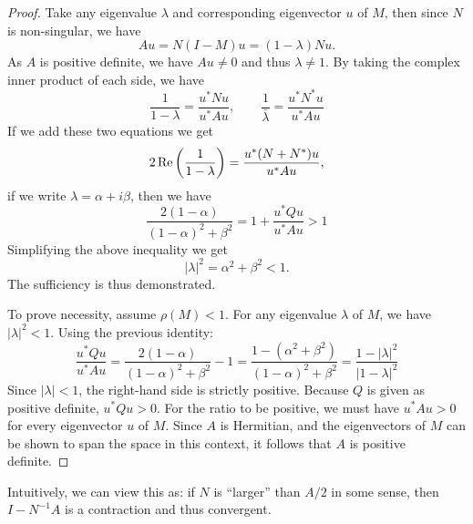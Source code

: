 \documentclass[../main.tex]{subfiles}
\begin{document}
\begin{proof}
	Take any eigenvalue $\lambda$ and corresponding eigenvector $u$ of $M$, then since $N$ is non-singular, we have
	\begin{equation*}
		A u = N(I - M) u = (1 - \lambda) N u.
	\end{equation*}
	As $A$ is positive definite, we have $A u \neq 0$ and thus $\lambda \neq 1$. By taking the complex inner product of each side, we have
	\begin{equation*}
		\frac{1}{1 - \lambda} = \frac{u^* N u}{u^* A u}, \qquad \frac{1}{\bar{\lambda}} = \frac{u^* N^* u}{u^* A u}
	\end{equation*}
	If we add these two equations we get
	\begin{equation*}
		2 \operatorname{Re} \left( \frac{1}{1 - \lambda} \right) = \frac{u^* (N + N^*) u}{u^* A u},
	\end{equation*}
	if we write $\lambda = \alpha + i \beta$, then we have
	\begin{equation*}
		\frac{2(1 - \alpha)}{(1 - \alpha)^2 + \beta^2} = 1 + \frac{u^* Q u}{u^* A u} > 1
	\end{equation*}
	Simplifying the above inequality we get
	\begin{equation}
		|\lambda|^2 = \alpha^2 + \beta^2 < 1.
	\end{equation}
	The sufficiency is thus demonstrated.

	To prove necessity, assume $\rho(M) < 1$. For any eigenvalue $\lambda$ of $M$, we have $|\lambda|^2 < 1$. Using the previous identity:
	\begin{equation*}
		\frac{u^* Q u}{u^* A u} = \frac{2(1 - \alpha)}{(1 - \alpha)^2 + \beta^2} - 1 = \frac{1 - (\alpha^2 + \beta^2)}{(1 - \alpha)^2 + \beta^2} = \frac{1 - |\lambda|^2}{|1 - \lambda|^2}
	\end{equation*}
	Since $|\lambda| < 1$, the right-hand side is strictly positive. Because $Q$ is given as positive definite, $u^* Q u > 0$. For the ratio to be positive, we must have $u^* A u > 0$ for every eigenvector $u$ of $M$. Since $A$ is Hermitian, and the eigenvectors of $M$ can be shown to span the space in this context, it follows that $A$ is positive definite.
\end{proof}

\begin{remark}
	Intuitively, we can view this as: if $N$ is ``larger'' than $A / 2$ in some sense, then $I - N^{-1} A$ is a contraction and thus convergent.
\end{remark}
\end{document}
